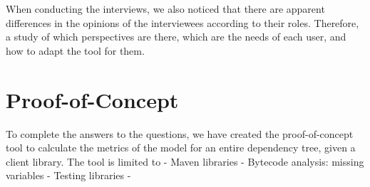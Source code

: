 When conducting the interviews, we also noticed that there are apparent differences in the opinions of the interviewees according to their roles. Therefore, a study of which perspectives are there, which are the needs of each user, and how to adapt the tool for them.

\section{Proof-of-Concept}

To complete the answers to the questions, we have created the proof-of-concept tool to calculate the metrics of the model for an entire dependency tree, given a client library. The tool is limited to 
- Maven libraries
- Bytecode analysis: missing variables
- Testing libraries
-
